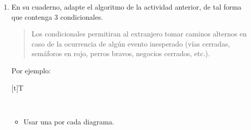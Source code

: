 \documentclass[letterpaper,10pt,spanish]{sphinxmanual}
\let\sphinxpxdimen\pdfpxdimen\else\newdimen\sphinxpxdimen
\begin{document}
\begin{enumerate}
\begin{itemize}
\item {} 
\sphinxAtStartPar
Para identificar las direcciones, se recomienda usar .

\item {} 
\sphinxAtStartPar
No olvide que el extranjero prefiere caminar (no moto, no cicla, no vehículo).

\item {} 
\sphinxAtStartPar
Antes de orientar al extranjero para ir a una nueva dirección, siempre verificar la ubicación actual para evitar que el extranjero se .

\end{itemize}

\item {} 
\sphinxAtStartPar
En su cuaderno, adapte el algoritmo de la actividad anterior, de tal forma que contenga 3 condicionales.
\begin{quote}

\sphinxAtStartPar
Los condicionales permitiran al extranjero tomar caminos alternos en caso de la ocurrencia de algún evento inesperado (vías cerradas, semáforos en rojo, perros bravos, negocios cerrados, etc.).
\end{quote}

\sphinxAtStartPar
Por ejemplo:


\begin{savenotes}\sphinxattablestart
\sphinxthistablewithglobalstyle
\centering
\begin{tabulary}{\linewidth}[t]{T}
\sphinxtoprule
\sphinxtableatstartofbodyhook

\begin{sphinxfigure-in-table}
\centering
\capstart
\noindent\sphinxincludegraphics[width=700\sphinxpxdimen]{{image134}.png}
\label{\detokenize{1_guias/10programacion/G1023:id16}}\end{sphinxfigure-in-table}\relax
\\
\sphinxbottomrule
\end{tabulary}
\sphinxtableafterendhook\par
\sphinxattableend\end{savenotes}
\begin{itemize}
\item {} 
\sphinxAtStartPar
Usar una  por cada diagrama.

\end{itemize}

\end{enumerate}
\end{document}
